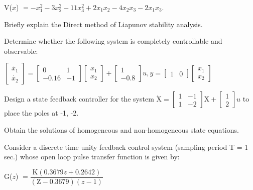 \hspace{1cm} V($x$) $ = -x_1^2 - 3x_2^2 - 11x_3^2 + 2x_1x_2 - 4x_2x_3 - 2x_1x_3.$
\item Briefly explain the Direct method of Liapunov stability analysis.

\markB

\newpage \again

\partC

\item \iitem Determine whether the following system is completely controllable and observable:

\hspace{1cm}$\begin{bmatrix} \dot{x_1}\\\dot{x_2}\end{bmatrix} = \begin{bmatrix}
  0 & 1\\
  -0.16 & -1 \end{bmatrix} \begin{bmatrix}
  x_1\\ 
  x_2 \end{bmatrix} + \begin{bmatrix}
  1 \\ -0.8 \end{bmatrix}
u,y = \begin{bmatrix} 1 & 0 \end{bmatrix}
\begin{bmatrix}
  x_1\\ 
  x_2 \end{bmatrix}$
\Or
\item Design a state feedback controller for the system $\dot{\text{X}} = \begin{bmatrix} 1 & -1\\
    1 & -2 \end{bmatrix} \text{X} + \begin{bmatrix} 1 \\ 2\end{bmatrix}u$ to place the poles
  at -1, -2.
\ene

\item \iitem Obtain the solutions of homogeneous and non-homogeneous state equations.
\Or
\item Consider a discrete time unity feedback control system (sampling period T = 1 sec.) whose
  open loop pulse transfer function is given by:

\hspace{1cm} G($z$) $ = \dfrac{\text{K} ( 0.3679z + 0.2642)}{(\text{Z} - 0.3679)(z -1)}$

